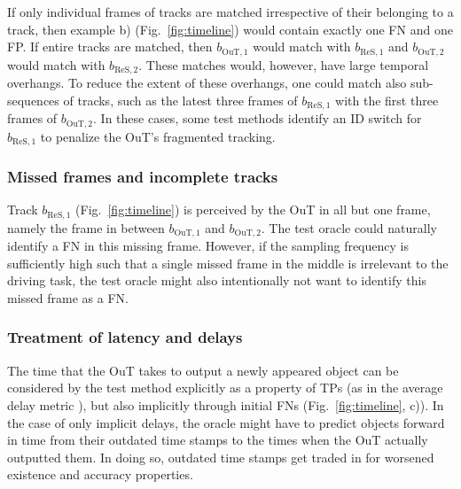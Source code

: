 \documentclass[conference]{IEEEtran}
\begin{document}
If only individual frames of tracks are matched irrespective of their belonging to a track, then example b) (Fig.~\ref{fig:timeline}) would contain exactly one FN and one FP. 
If entire tracks are matched, then $b_{\text{OuT},1}$ would match with $b_{\text{ReS},1}$ and $b_{\text{OuT},2}$ would match with $b_{\text{ReS},2}$.
These matches would, however, have large temporal overhangs.
To reduce the extent of these overhangs, one could match also sub-sequences of tracks, such as the latest three frames of $b_{\text{ReS},1}$ with the first three frames of $b_{\text{OuT},2}$.
In these cases, some test methods identify an ID switch for $b_{\text{ReS},1}$ to penalize the OuT's fragmented tracking.

\subsubsection{Missed frames and incomplete tracks}
\label{sec:temp_incomplete}

Track $b_{\text{ReS},1}$ (Fig.~\ref{fig:timeline}) is perceived by the OuT in all but one frame, namely the frame in between $b_{\text{OuT},1}$ and $b_{\text{OuT},2}$. 
The test oracle could naturally identify a FN in this missing frame. 
However, if the sampling frequency is sufficiently high such that a single missed frame in the middle is irrelevant to the driving task, the test oracle might also intentionally not want to identify this missed frame as a FN. 



\subsubsection{Treatment of latency and delays}
\label{sec:temp_latency}

The time that the OuT takes to output a newly appeared object can be considered by the test method explicitly as a property of TPs (as in the average delay metric \cite{Mao2019delay}), but also implicitly through initial FNs (Fig.~\ref{fig:timeline}, c)).
In the case of only implicit delays, the oracle might have to  predict objects forward in time from their outdated time stamps to the times when the OuT actually outputted them. In doing so, outdated time stamps get traded in for worsened existence and accuracy properties.
\end{document}
